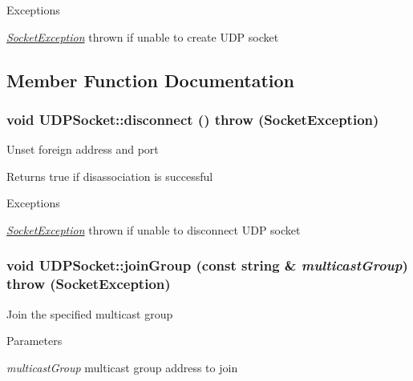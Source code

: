\begin{DoxyExceptions}{Exceptions}
\item[{\em \hyperlink{classSocketException}{SocketException}}]thrown if unable to create UDP socket \end{DoxyExceptions}


\subsection{Member Function Documentation}
\hypertarget{classUDPSocket_a7482e8e61cef160e1a7c0d6ac15c01be}{
\subsubsection[{disconnect}]{\setlength{\rightskip}{0pt plus 5cm}void UDPSocket::disconnect ()  throw ({\bf SocketException})}}
\label{classUDPSocket_a7482e8e61cef160e1a7c0d6ac15c01be}
Unset foreign address and port \begin{DoxyReturn}{Returns}
true if disassociation is successful 
\end{DoxyReturn}

\begin{DoxyExceptions}{Exceptions}
\item[{\em \hyperlink{classSocketException}{SocketException}}]thrown if unable to disconnect UDP socket \end{DoxyExceptions}
\hypertarget{classUDPSocket_a1b20c1e8bd49a9bd9b53dd4f1c8d4c11}{
\subsubsection[{joinGroup}]{\setlength{\rightskip}{0pt plus 5cm}void UDPSocket::joinGroup (const string \& {\em multicastGroup})  throw ({\bf SocketException})}}
\label{classUDPSocket_a1b20c1e8bd49a9bd9b53dd4f1c8d4c11}
Join the specified multicast group 
\begin{DoxyParams}{Parameters}
\item[{\em multicastGroup}]multicast group address to join \end{DoxyParams}

